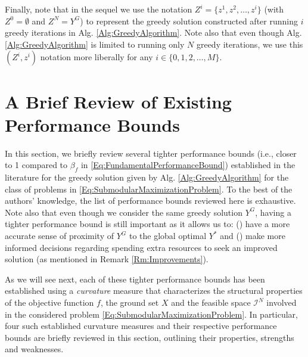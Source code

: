 \documentclass[conference]{IEEEtran}
\begin{document}
Finally, note that in the sequel we use the notation $Z^i = \{z^1,z^2,\ldots,z^i\}$ (with $Z^0=\emptyset$ and $Z^N=Y^G$) to represent the greedy solution constructed after running $i$ greedy iterations in Alg. \ref{Alg:GreedyAlgorithm}. Note also that even though Alg. \ref{Alg:GreedyAlgorithm} is limited to running only $N$ greedy iterations, we use this $(Z^i,z^i)$ notation more liberally for any $i\in\{0,1,2,\ldots,M\}$. 




\section{A Brief Review of Existing Performance Bounds}
\label{Sec:LiteratureReview}



In this section, we briefly review several tighter performance bounds (i.e., closer to 1 compared to $\beta_f$ in \eqref{Eq:FundamentalPerformanceBound}) established in the literature for the greedy solution given by Alg. \ref{Alg:GreedyAlgorithm} for the class of problems in \eqref{Eq:SubmodularMaximizationProblem}. To the best of the authors' knowledge, the list of performance bounds reviewed here is exhaustive. Note also that even though we consider the same greedy solution $Y^G$, having a tighter performance bound is still important as it allows us to: () have a more accurate sense of proximity of $Y^G$ to the global optimal $Y^*$ and () make more informed decisions regarding spending extra resources to seek an improved solution (as mentioned in Remark \ref{Rm:Improvements}). 



As we will see next, each of these tighter performance bounds has been established using a \emph{curvature} measure that characterizes the structural properties of the objective function $f$, the ground set $X$ and the feasible space $\mathcal{I}^N$ involved in the considered problem \eqref{Eq:SubmodularMaximizationProblem}. In particular, four such established curvature measures and their respective performance bounds are briefly reviewed in this section, outlining their properties, strengths and weaknesses. 


\end{document}
